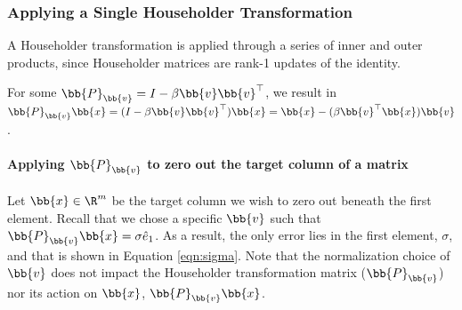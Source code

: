 
\subsubsection{Applying a Single Householder Transformation}
A Householder transformation is applied through a series of inner and outer products, since Householder matrices are rank-1 updates of the identity. 

For some $\bb{P}_{\bb{v}}=I-\beta \bb{v}\bb{v}^{\top}$, we result in $\bb{P}_{\bb{v}} \bb{x} = (I-\beta \bb{v}\bb{v}^{\top})\bb{x} = \bb{x} - (\beta \bb{v}^{\top}\bb{x})\bb{v}$.
\paragraph{Applying $\bb{P}_{\bb{v}}$ to zero out the target column of a matrix}
Let $\bb{x}\in\R^{m}$ be the target column we wish to zero out beneath the first element.
Recall that we chose a specific $\bb{v}$ such that $\bb{P}_{\bb{v}}\bb{x} = \sigma \hat{e}_1$. 
As a result, the only error lies in the first element, $\sigma$, and that is shown in Equation \ref{eqn:sigma}.
Note that the normalization choice of $\bb{v}$ does not impact the Householder transformation matrix ($\bb{P}_{\bb{v}}$) nor its action on $\bb{x}$, $\bb{P}_{\bb{v}}\bb{x}$.

